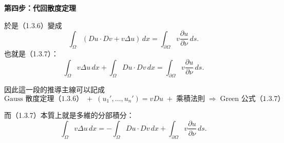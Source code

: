 \documentclass[11pt,a4paper,twoside]{article}
\newif\ifstudynotes
\newcommand{\StudyNote}[2]{%
    \ifstudynotes
    \begin{studyNote}[title={#1}]
    #2
    \end{studyNote}
    \fi
}
\begin{document}
{    \vspace{0.4em}
    \noindent
    \textbf{第四步：代回散度定理}

    於是（1.3.6）變成
    \[
        \int_{\Omega}
        \left(
        Du\cdot Dv+v\Delta u
        \right)\,dx
        =
        \int_{\partial\Omega}
        v\frac{\partial u}{\partial\nu}\,ds.
    \]
    也就是（1.3.7）：
    \[
        \boxed{
            \int_{\Omega}v\Delta u\,dx
            +
            \int_{\Omega}Du\cdot Dv\,dx
            =
            \int_{\partial\Omega}
            v\frac{\partial u}{\partial\nu}\,ds
        }.
    \]

    因此這一段的推導主線可以記成
    \[
        \boxed{
            \text{Gauss 散度定理（1.3.6）}
            \;+\;
            (u_1',\ldots,u_n')=vDu
            \;+\;
            \text{乘積法則}
            \;\Longrightarrow\;
            \text{Green 公式（1.3.7）}
        }.
    \]

    而（1.3.7）本質上就是多維的分部積分：
    \[
        \boxed{
            \int_\Omega v\Delta u\,dx
            =
            -\int_\Omega Du\cdot Dv\,dx
            +
            \int_{\partial\Omega}
            v\frac{\partial u}{\partial\nu}\,ds
        }.
    \]
}

\StudyNote{複習註解：法向導數 $\displaystyle \frac{\partial u}{\partial\nu}$}{
    法向導數其實就是\textbf{方向導數}的一個特殊情形：方向特別選成邊界
    $\partial\Omega$ 上的外法向單位向量 $\nu$。

    設 $x_0\in\partial\Omega$，從 $x_0$ 沿著外法向方向 $\nu$ 移動。
    用參數 $t$ 表示移動距離，路徑可寫成
    \[
        x(t)=x_0+t\nu.
    \]
    把多變數函數 $u$ 限制在這條直線上，得到一個一變數函數
    \[
        g(t)=u(x_0+t\nu).
    \]
    因此，$u$ 在 $x_0$ 沿 $\nu$ 方向的變化率就是
    \[
        \frac{\partial u}{\partial\nu}(x_0)
        =
        \left.
        \frac{d}{dt}u(x_0+t\nu)
        \right|_{t=0}.
    \]

    利用鏈式法則，
    \[
        \frac{d}{dt}u(x_0+t\nu)
        =
        Du(x_0+t\nu)\cdot\nu.
    \]
    令 $t=0$，便得到
    \[
        \boxed{
            \frac{\partial u}{\partial\nu}(x_0)
            =
            Du(x_0)\cdot\nu
        }.
    \]

    在二維中，若
    \[
        Du=(D_1u,D_2u),
        \qquad
        \nu=(\nu_1,\nu_2),
    \]
    則
    \[
        \frac{\partial u}{\partial\nu}
        =
        D_1u\,\nu_1+D_2u\,\nu_2.
    \]
    而本書（1.3.6）使用方向餘弦記號
    \[
        \nu_i=\cos(\nu,x_i),
    \]
    因此在 $n$ 維中
    \[
        \frac{\partial u}{\partial\nu}
        =
        \sum_{i=1}^{n}
        D_i u\,\cos(\nu,x_i).
    \]

    幾何上，
    \[
        Du\cdot\nu
        =
        |Du|\,|\nu|\cos\theta.
    \]
    由於 $\nu$ 是單位向量，$|\nu|=1$，所以
    \[
        \frac{\partial u}{\partial\nu}
        =
        |Du|\cos\theta.
    \]
    因此法向導數可理解成：
    \[
        \boxed{
            \text{梯度 }Du\text{ 在外法線方向 }\nu\text{ 上的分量（投影）}
        }.
    \]

    這也說明為什麼 Green 公式的邊界項會出現
    \[
        v\frac{\partial u}{\partial\nu}.
    \]
    因為散度定理的邊界積分只取向量場穿過邊界的\textbf{法向分量}。
}
\end{document}
